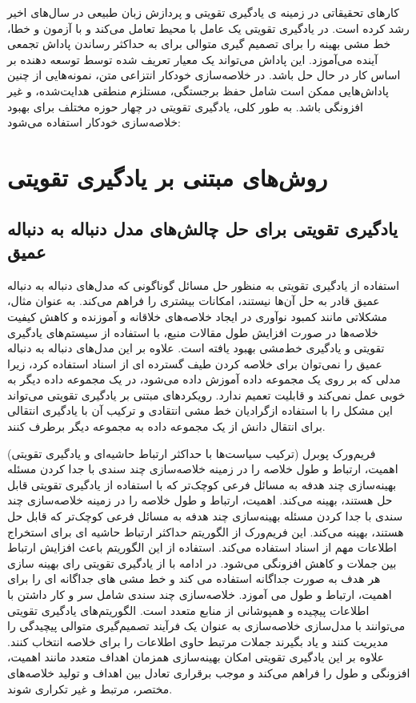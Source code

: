 کارهای تحقیقاتی در زمینه ی یادگیری تقویتی
و پردازش زبان طبیعی در سال‌های اخیر رشد کرده است. در یادگیری تقویتی یک عامل با محیط تعامل می‌کند و با آزمون و خطا، خط مشی بهینه را برای تصمیم گیری متوالی برای به حداکثر رساندن پاداش تجمعی آینده می‌آموزد. این پاداش می‌تواند یک معیار تعریف شده توسط توسعه دهنده بر اساس کار در حال حل باشد. در خلاصه‌سازی خودکار انتزاعی متن، نمونه‌هایی از چنین پاداش‌هایی ممکن است شامل حفظ برجستگی، مستلزم منطقی هدایت‌شده، و غیر افزونگی باشد. به طور کلی، یادگیری تقویتی در چهار حوزه مختلف برای بهبود خلاصه‌سازی خودکار استفاده می‌شود:

\section{روش‌های مبتنی بر یادگیری تقویتی}
\subsection{ یادگیری تقویتی برای حل چالش‌های مدل دنباله به دنباله عمیق}

استفاده از یادگیری تقویتی به منظور حل مسائل گوناگونی که مدل‌های دنباله به دنباله عمیق قادر به حل آن‌ها نیستند، امکانات بیشتری را فراهم می‌کند. به عنوان مثال، مشکلاتی مانند کمبود نوآوری در ایجاد خلاصه‌های خلاقانه و آموزنده و کاهش کیفیت خلاصه‌ها در صورت افزایش طول مقالات منبع، با استفاده از سیستم‌های یادگیری تقویتی و یادگیری خط‌مشی بهبود یافته است.
علاوه بر این مدل‌های دنباله به دنباله عمیق را نمی‌توان برای خلاصه کردن طیف گسترده ای از اسناد استفاده کرد، زیرا مدلی که بر روی یک مجموعه داده آموزش داده می‌شود، در یک مجموعه داده دیگر به خوبی عمل نمی‌کند و قابلیت تعمیم ندارد. رویکردهای مبتنی بر یادگیری تقویتی می‌تواند این مشکل را با استفاده ازگرادیان خط مشی انتقادی 
و ترکیب آن با یادگیری انتقالی
برای انتقال دانش از یک مجموعه داده به مجموعه دیگر برطرف کنند\cite{DeepTL_RL}.

فریم‌ورک پوبرل
(ترکیب سیاست‌ها با حداکثر ارتباط حاشیه‌ای و یادگیری تقویتی) اهمیت، ارتباط و طول خلاصه را در زمینه خلاصه‌سازی چند سندی با جدا کردن مسئله بهینه‌سازی چند هدفه به مسائل فرعی کوچک‌تر که با استفاده از یادگیری تقویتی قابل حل هستند، بهینه می‌کند. 
اهمیت، ارتباط و طول خلاصه را در زمینه خلاصه‌سازی چند سندی با جدا کردن مسئله بهینه‌سازی چند هدفه به مسائل فرعی کوچک‌تر که قابل حل هستند، بهینه می‌کند.
این فریم‌ورک از الگوریتم حداکثر ارتباط حاشیه ای
برای استخراج اطلاعات مهم از اسناد استفاده می‌کند. استفاده از این الگوریتم باعث افزایش ارتباط بین جملات و کاهش افزونگی می‌شود.
در ادامه با از یادگیری تقویتی رای بهینه سازی هر هدف به صورت جداگانه استفاده می کند و خط مشی های جداگانه ای را برای اهمیت، ارتباط و طول می آموزد\cite{PoBRL}.
خلاصه‌سازی چند سندی شامل سر و کار داشتن با اطلاعات پیچیده و همپوشانی از منابع متعدد است. الگوریتم‌های یادگیری تقویتی می‌توانند با مدل‌سازی خلاصه‌سازی به عنوان یک فرآیند تصمیم‌گیری متوالی پیچیدگی را مدیریت کنند و یاد بگیرند جملات مرتبط حاوی اطلاعات را برای خلاصه انتخاب کنند. علاوه بر این یادگیری تقویتی امکان بهینه‌سازی همزمان اهداف متعدد مانند اهمیت، افزونگی و طول را فراهم می‌کند و موجب برقراری تعادل بین اهداف و تولید خلاصه‌‌های مختصر، مرتبط و غیر تکراری شوند.

